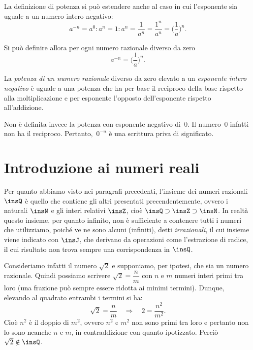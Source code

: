 La definizione di potenza si può estendere anche al caso in cui l'esponente sia uguale a un numero intero negativo:
\[a^{-n}=a^0:a^n=1:a^n=\frac{1}{a^n}=\frac{1^n}{a^n}=\bigg(\frac{1}{a}\bigg)^n.\]

Si può definire allora per ogni numero razionale diverso da zero
\[a^{-n}=\bigg(\frac{1}{a}\bigg)^n.\]

\begin{definizione}
La \emph{potenza di un numero razionale} diverso da zero elevato a un \emph{esponente intero negativo} è
uguale a una potenza che ha per base il reciproco della base rispetto
alla moltiplicazione e per esponente l'opposto dell'esponente rispetto all'addizione.
\end{definizione}

Non è definita invece la potenza con esponente negativo di~0. Il numero~0 infatti non ha il reciproco.
Pertanto,~$0^{-n}$ è una scrittura priva di significato.

\vspazio\ovalbox{\risolvii \ref{ese:3.61}, \ref{ese:3.62}, \ref{ese:3.63}, \ref{ese:3.64}, \ref{ese:3.65}, \ref{ese:3.66}}

\section{Introduzione ai numeri reali}\label{sect:intro_numeri_reali}

Per quanto abbiamo visto nei paragrafi precedenti, l'insieme dei numeri razionali $\insQ$ è quello che contiene gli altri presentati precendentemente, ovvero i naturali $\insN$ e gli interi relativi $\insZ$, cioè $\insQ \supset \insZ \supset \insN$. In realtà questo insieme, per quanto infinito, non è sufficiente a contenere tutti i numeri che utilizziamo, poiché ve ne sono alcuni (infiniti), detti \emph{irrazionali}, il cui insieme viene indicato con $\insJ$, che derivano da operazioni come l'estrazione di radice, il cui risultato non trova sempre una corrispondenza in $\insQ$.

Consideriamo infatti il numero $\sqrt{2}$ e supponiamo, per ipotesi, che sia un numero razionale. Quindi possiamo scrivere $\sqrt{2} = \dfrac{n}{m}$ con $n$ e $m$ numeri interi primi tra loro (una frazione può sempre essere ridotta ai minimi termini). Dunque, elevando al quadrato entrambi i termini si ha:
\[\sqrt{2}=\frac{n}{m} \quad\Rightarrow\quad 2=\frac{n^2}{m^2}.\]
Cioè $n^2$ è il doppio di $m^2$, ovvero $n^2$ e $m^2$ non sono primi tra loro e pertanto non lo sono neanche $n$ e $m$, in contraddizione con quanto ipotizzato. Perciò $\sqrt{2} \notin \insQ$.

